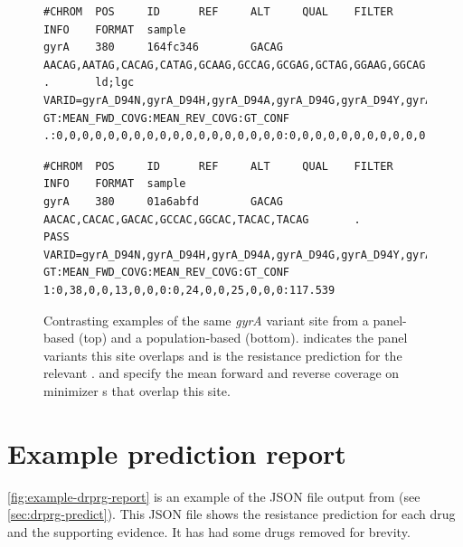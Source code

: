 \begin{figure}
\begin{Verbatim}[breaklines=true,breakanywhere=true,frame=single,framerule=0.5mm,fontsize=\footnotesize,label=\textit{gyrA} mutation S95T VCF entry for panel-based \prg{}]
#CHROM  POS     ID      REF     ALT     QUAL    FILTER  INFO    FORMAT  sample
gyrA    380     164fc346        GACAG     AACAG,AATAG,CACAG,CATAG,GCAAG,GCCAG,GCGAG,GCTAG,GGAAG,GGCAG,GGGAG,GGTAG,TACAG,TATAG,TGCAG,TGTAG,GACAC .       ld;lgc  VARID=gyrA_D94N,gyrA_D94H,gyrA_D94A,gyrA_D94G,gyrA_D94Y,gyrA_D94C,gyrA_S95T;PREDICT=S,S,S,S,S,S,S  GT:MEAN_FWD_COVG:MEAN_REV_COVG:GT_CONF     .:0,0,0,0,0,0,0,0,0,0,0,0,0,0,0,0,0,0:0,0,0,0,0,0,0,0,0,0,0,0,0,0,0,0,0,0:0
\end{Verbatim}
\begin{Verbatim}[breaklines=true,breakanywhere=true,frame=single,framerule=0.5mm,fontsize=\footnotesize,label=\textit{gyrA} mutation S95T VCF entry for population-based \prg{}]
#CHROM  POS     ID      REF     ALT     QUAL    FILTER  INFO    FORMAT  sample
gyrA    380     01a6abfd        GACAG   AACAC,CACAC,GACAC,GCCAC,GGCAC,TACAC,TACAG       .       PASS    VARID=gyrA_D94N,gyrA_D94H,gyrA_D94A,gyrA_D94G,gyrA_D94Y,gyrA_D94C,gyrA_S95T;PREDICT=R,S,S,S,S,S,S      GT:MEAN_FWD_COVG:MEAN_REV_COVG:GT_CONF     1:0,38,0,0,13,0,0,0:0,24,0,0,25,0,0,0:117.539
\end{Verbatim}
\caption{Contrasting examples of the same \textit{gyrA} variant site from a panel-based \prg{} (top) and a population-based \prg{} (bottom).  indicates the panel variants this site overlaps and  is the resistance prediction for the relevant .  and  specify the mean forward and reverse \kmer{} coverage on minimizer \kmer{}s that overlap this site.}
\label{fig:example-gyrA-dense}
\end{figure}

\section{Example \drprg{} prediction report}

\autoref{fig:example-drprg-report} is an example of the JSON file output from \drprg{}  (see \autoref{sec:drprg-predict}). This JSON file shows the resistance prediction for each drug and the supporting evidence. It has had some drugs removed for brevity.

